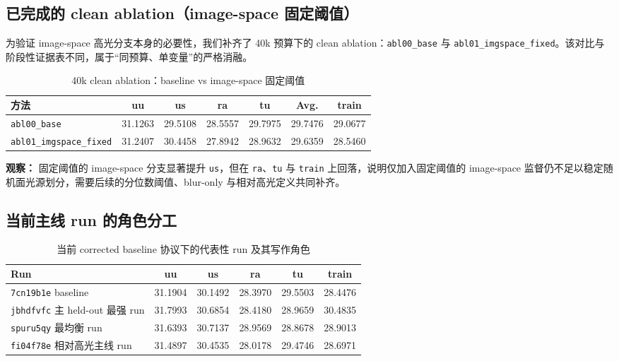 \documentclass[UTF8,a4paper]{ctexart}
\begin{document}
\subsection{已完成的 clean ablation（image-space 固定阈值）}

为验证 image-space 高光分支本身的必要性，我们补齐了 40k 预算下的 clean ablation：\texttt{abl00\_base} 与 \texttt{abl01\_imgspace\_fixed}。该对比与阶段性证据表不同，属于“同预算、单变量”的严格消融。

\begin{table}[htbp]
\centering
\small
\setlength{\tabcolsep}{4pt}
\caption{40k clean ablation：baseline vs image-space 固定阈值}
\label{tab:clean_ablation_imgspace}
\begin{tabular}{p{3.6cm}cccccc}
\toprule
方法 & uu & us & ra & tu & Avg. & train \\
\midrule
\texttt{abl00\_base} & 31.1263 & 29.5108 & 28.5557 & 29.7975 & 29.7476 & 29.0677 \\
\texttt{abl01\_imgspace\_fixed} & 31.2407 & 30.4458 & 27.8942 & 28.9632 & 29.6359 & 28.5460 \\
\bottomrule
\end{tabular}
\end{table}

\noindent\textbf{观察：} 固定阈值的 image-space 分支显著提升 \texttt{us}，但在 \texttt{ra}、\texttt{tu} 与 \texttt{train} 上回落，说明仅加入固定阈值的 image-space 监督仍不足以稳定随机面光源划分，需要后续的分位数阈值、blur-only 与相对高光定义共同补齐。

\subsection{当前主线 run 的角色分工}

\begin{table}[htbp]
\centering
\caption{当前 corrected baseline 协议下的代表性 run 及其写作角色}
\begin{tabular}{lccccc}
\toprule
Run & uu & us & ra & tu & train \\
\midrule
\texttt{7cn19b1e} baseline & 31.1904 & 30.1492 & 28.3970 & 29.5503 & 28.4476 \\
\texttt{jbhdfvfc} 主 held-out 最强 run & 31.7993 & 30.6854 & 28.4180 & 28.9659 & 30.4835 \\
\texttt{spuru5qy} 最均衡 run & 31.6393 & 30.7137 & 28.9569 & 28.8678 & 28.9013 \\
\texttt{fi04f78e} 相对高光主线 run & 31.4897 & 30.4535 & 28.0178 & 29.4746 & 28.6971 \\
\bottomrule
\end{tabular}
\end{table}
\end{document}
